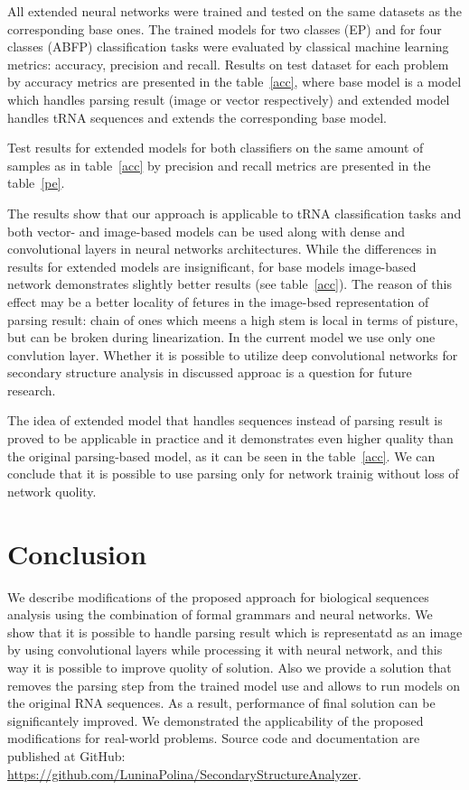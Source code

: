 \documentclass[12pt,a4paper]{cibb}
\begin{document}
All extended neural networks were trained and tested on the same datasets as the corresponding base ones. The trained models for two classes (EP) and for four classes (ABFP) classification tasks were evaluated by classical machine learning metrics: accuracy, precision and recall.
Results on test dataset for each problem by accuracy metrics are presented in the table~\ref{acc}, where base model is a model which handles parsing result (image or vector respectively) and extended model handles tRNA sequences and extends the corresponding base model.



Test results for extended models for both classifiers on the same amount of samples as in table~\ref{acc} by precision and recall metrics  are presented in the table~\ref{pe}.




The results show that our approach is applicable to tRNA classification tasks and both vector- and image-based models can be used along with dense and convolutional layers in neural networks architectures.
While the differences in results for extended models are insignificant, for base models image-based network demonstrates slightly better results (see table~\ref{acc}).
The reason of this effect may be a better locality of fetures in the image-bsed representation of parsing result: chain of ones which meens a high stem is local in terms of pisture, but can be broken during linearization.
In the current model we use only one convlution layer.
Whether it is possible to utilize deep convolutional networks for secondary structure analysis in discussed approac is a question for future research.

The idea of extended model that handles sequences instead of parsing result is proved to be applicable in practice and it demonstrates even higher quality than the original parsing-based model, as it can be seen in the table~\ref{acc}.
We can conclude that it is possible to use parsing only for network trainig without loss of network quolity.

\section{\bf Conclusion}

We describe modifications of the proposed approach for biological sequences analysis using the combination of formal grammars and neural networks.
We show that it is possible to handle parsing result which is representatd as an image by using convolutional layers while processing it with neural network, and this way it is possible to improve quolity of solution.
Also we provide a solution that removes the parsing step from the trained model use and allows to run models on the original RNA sequences.
As a result, performance of final solution can be significantely improved.
We demonstrated the applicability of the proposed modifications for real-world problems.
Source code and documentation are published at GitHub: \url{https://github.com/LuninaPolina/SecondaryStructureAnalyzer}.
\end{document}
